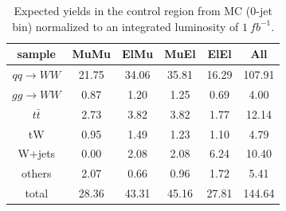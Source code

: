 \begin{table}[!htbp]
\begin{center}
\begin{tabular}{|c|c|c|c|c|c|} \hline
 sample               &       MuMu &       ElMu &       MuEl &       ElEl &        All \\ \hline\hline
   $qq\rightarrow WW$ &      21.75 &      34.06 &      35.81 &      16.29 &     107.91 \\ 
   $gg\rightarrow WW$ &       0.87 &       1.20 &       1.25 &       0.69 &       4.00 \\ 
  $t\bar t$           &       2.73 &       3.82 &       3.82 &       1.77 &      12.14 \\ 
     tW               &       0.95 &       1.49 &       1.23 &       1.10 &       4.79 \\ 
 W+jets               &       0.00 &       2.08 &       2.08 &       6.24 &      10.40 \\ 
 others               &       2.07 &       0.66 &       0.96 &       1.72 &       5.41 \\ \hline
  total               &      28.36 &      43.31 &      45.16 &      27.81 &     144.64 \\ \hline
\end{tabular}
\caption{Expected yields in the control region from MC (0-jet bin) normalized to an integrated luminosity of $1~fb^{-1}$.}
\label{tab:wwEstimationSByields}
\end{center}
\end{table}


